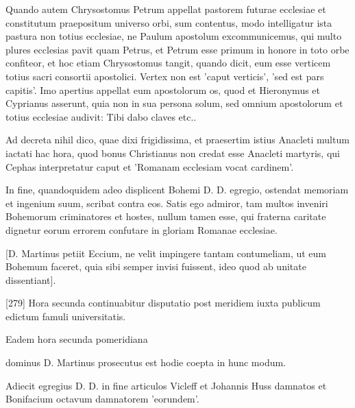 Quando autem Chrysostomus Petrum appellat pastorem futurae ecclesiae et constitutum praepositum universo orbi, sum contentus, modo intelligatur ista pastura non totius ecclesiae, ne Paulum apostolum excommunicemus, qui multo plures ecclesias pavit quam Petrus, et Petrum esse primum in honore in toto orbe confiteor, et hoc etiam Chrysostomus tangit, quando dicit, eum esse verticem totius sacri consortii apostolici. Vertex non est 'caput verticis', 'sed est pars capitis'. Imo apertius appellat eum apostolorum os, quod et Hieronymus et Cyprianus asserunt, quia non in sua persona solum, sed omnium apostolorum et totius ecclesiae audivit: Tibi dabo claves etc..

Ad decreta nihil dico, quae dixi frigidissima, et praesertim istius Anacleti multum iactati hac hora, quod bonus Christianus non credat esse Anacleti martyris, qui Cephas interpretatur caput et 'Romanam ecclesiam vocat cardinem'.

In fine, quandoquidem adeo displicent Bohemi D. D. egregio, ostendat memoriam et ingenium suum, scribat contra eos. Satis ego admiror, tam multos inveniri Bohemorum criminatores et hostes, nullum tamen esse, qui fraterna caritate dignetur eorum errorem confutare in gloriam Romanae ecclesiae.

[D. Martinus petiit Eccium, ne velit impingere tantam contumeliam, ut eum Bohemum faceret, quia sibi semper invisi fuissent, ideo quod ab unitate dissentiant].

[279] Hora secunda continuabitur disputatio post meridiem iuxta publicum edictum famuli universitatis.

Eadem hora secunda pomeridiana

dominus D. Martinus prosecutus est hodie coepta in hunc modum.

Adiecit egregius D. D. in fine articulos Vicleff et Johannis Huss damnatos et Bonifacium octavum damnatorem 'eorundem'.

